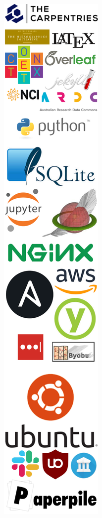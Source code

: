 \documentclass[17pt, a2paper, portrait]{tikzposter}
\begin{document}
\begin{columns}
{}
%
{
\centering
\includegraphics[width=.95\linewidth]{images/logoWallResbaz2019.png}
}


\end{columns}
\end{document}
